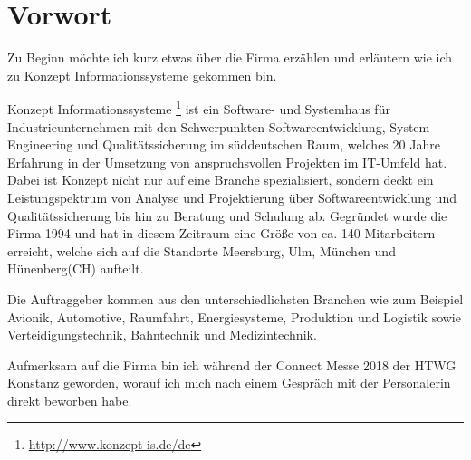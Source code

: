 \chapter{Vorwort}
\label{ch:0}

Zu Beginn möchte ich kurz etwas über die Firma erzählen und erläutern wie ich 
zu Konzept Informationssysteme gekommen bin.

Konzept Informationssysteme \footnote{\url{http://www.konzept-is.de/de}} ist ein Software- und Systemhaus für Industrieunternehmen mit den Schwerpunkten Softwareentwicklung, System Engineering und Qualitätssicherung im süddeutschen Raum, welches 20 Jahre Erfahrung in der Umsetzung von anspruchsvollen Projekten im IT-Umfeld hat. Dabei ist Konzept nicht nur auf eine Branche spezialisiert, sondern deckt ein Leistungspektrum von Analyse und Projektierung über Softwareentwicklung und Qualitätssicherung bis hin zu Beratung und Schulung ab.
Gegründet wurde die Firma 1994 und hat in diesem Zeitraum eine Größe von ca. 140 Mitarbeitern erreicht, welche sich auf die Standorte Meersburg, Ulm, München und Hünenberg(CH) aufteilt. 

Die Auftraggeber kommen aus den unterschiedlichsten Branchen wie zum Beispiel Avionik, Automotive, Raumfahrt, Energiesysteme, Produktion und Logistik sowie Verteidigungstechnik, Bahntechnik und Medizintechnik.

Aufmerksam auf die Firma bin ich während der Connect Messe 2018 der HTWG Konstanz geworden, worauf ich mich nach einem Gespräch mit der Personalerin direkt beworben habe.
